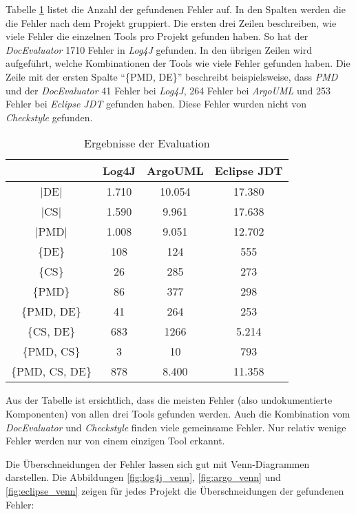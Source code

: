 Tabelle \ref{tab:eval_results} listet die Anzahl der gefundenen Fehler auf. In den Spalten werden die die Fehler nach dem Projekt gruppiert. Die ersten drei Zeilen beschreiben, wie viele Fehler die einzelnen Tools pro Projekt gefunden haben. So hat  der \textit{DocEvaluator} 1710 Fehler in \textit{Log4J} gefunden.  In den übrigen Zeilen wird aufgeführt, welche Kombinationen der Tools wie viele Fehler gefunden haben. Die Zeile mit der ersten Spalte \enquote{\{PMD, DE\}} beschreibt beispielsweise, dass \textit{PMD} und der  \textit{DocEvaluator} 41 Fehler bei \textit{Log4J}, 264 Fehler bei \textit{ArgoUML} und 253 Fehler bei \textit{Eclipse \ac{JDT}} gefunden haben. Diese Fehler wurden nicht von \textit{Checkstyle} gefunden.  
\begin{table}[]
    \centering
\begin{tabular}{c|c|c|c}
          & Log4J & ArgoUML & Eclipse \ac{JDT} \\ \hline
|DE|            & 1.710 & 10.054  & 17.380      \\ \hline
|CS|            & 1.590 & 9.961   & 17.638      \\ \hline
|PMD|           & 1.008 & 9.051   & 12.702      \\ \hline\hline
\{DE\}          & 108   & 124     & 555         \\ \hline
\{CS\}          & 26    & 285     & 273         \\ \hline
\{PMD\}         & 86    & 377     & 298         \\ \hline
\{PMD, DE\}     & 41    & 264     & 253         \\ \hline
\{CS, DE\}      & 683   & 1266    & 5.214       \\ \hline
\{PMD, CS\}     & 3     & 10      & 793         \\ \hline
\{PMD, CS, DE\} & 878   & 8.400   & 11.358      \\ \hline
\end{tabular}
    \caption{Ergebnisse der Evaluation}
    \label{tab:eval_results}
\end{table}

Aus der Tabelle ist ersichtlich, dass die meisten Fehler (also undokumentierte Komponenten) von allen drei Tools gefunden werden. Auch die Kombination vom \textit{DocEvaluator} und \textit{Checkstyle} finden viele gemeinsame Fehler. Nur relativ wenige Fehler werden nur von einem einzigen Tool erkannt. 

Die Überschneidungen der Fehler lassen sich gut mit Venn-Diagrammen darstellen.  Die Abbildungen \ref{fig:log4j_venn}, \ref{fig:argo_venn} und  \ref{fig:eclipse_venn} zeigen für jedes Projekt die Überschneidungen der gefundenen Fehler:

